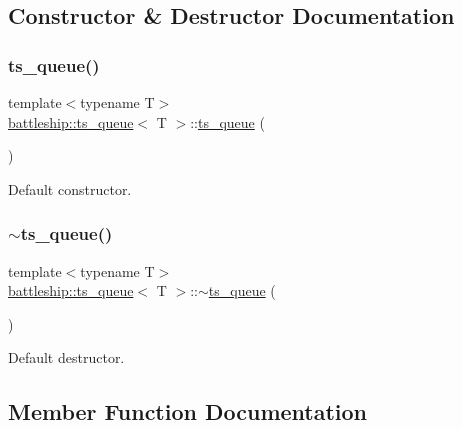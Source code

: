 \subsection{Constructor \& Destructor Documentation}
\mbox{\label{classbattleship_1_1ts__queue_a8c5d650bd3c8da2226a93ef16eddf259}} 
\subsubsection{\texorpdfstring{ts\+\_\+queue()}{ts\_queue()}}
{\footnotesize\ttfamily template$<$typename T$>$ \\
\hyperlink{classbattleship_1_1ts__queue}{battleship\+::ts\+\_\+queue}$<$ T $>$\+::\hyperlink{classbattleship_1_1ts__queue}{ts\+\_\+queue} (\begin{DoxyParamCaption}{ }\end{DoxyParamCaption})\hspace{0.3cm}{\ttfamily [inline]}}

Default constructor. \mbox{\label{classbattleship_1_1ts__queue_ad1dcfe27a6218886353c17c9334a4232}} 
\subsubsection{\texorpdfstring{$\sim$ts\+\_\+queue()}{~ts\_queue()}}
{\footnotesize\ttfamily template$<$typename T$>$ \\
\hyperlink{classbattleship_1_1ts__queue}{battleship\+::ts\+\_\+queue}$<$ T $>$\+::$\sim$\hyperlink{classbattleship_1_1ts__queue}{ts\+\_\+queue} (\begin{DoxyParamCaption}{ }\end{DoxyParamCaption})\hspace{0.3cm}{\ttfamily [inline]}}

Default destructor. 

\subsection{Member Function Documentation}
\mbox{\label{classbattleship_1_1ts__queue_accbd5de0ef9994e7b99f2e9113a36677}} 
